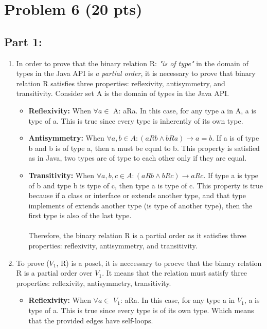 \clearpage
\newpage

\section{Problem 6 (20 pts)}

\subsection{Part 1:}
\begin{enumerate}
    \item In order to prove that the binary relation R: \textit{"is of type"} in the domain of types in the Java API is \textit{a partial order}, it is necessary to prove that binary relation R satisfies three properties: reflexivity, antisymmetry, and transitivity. Consider set A is the domain of types in the Java API.
    \begin{itemize}
        \item \textbf{Reflexivity: } When $\forall a \in$ A: aRa. In this case, for any type a in A, a is type of a. This is true since every type is inherently of its own type.
        \item \textbf{Antisymmetry: } When $\forall a, b \in A: (aRb \wedge bRa) \rightarrow a = b$. If a is of type b and b is of type a, then a must be equal to b. This property is satisfied as in Java, two types are of type to each other only if they are equal. 
        \item \textbf{Transitivity: } When $\forall a, b, c \in A: (aRb \wedge bRc) \rightarrow aRc$. If type a is type of b and type b is type of c, then type a is type of c. This property is true because if a class or interface or extends another type, and that type implements of extends another type (is type of another type), then the first type is also of the last type. \\ \\
        Therefore, the binary relation R is a partial order as it satisfies three properties: reflexivity, antisymmetry, and transitivity. 
    \end{itemize}
    \item To prove ($V_{1}$, R) is a poset, it is neccessary to procve that the binary relation R is a partial order over $V_{1}$. It means that the relation must satisfy three properties: reflexivity, antisymmetry, transitivity. 
    \begin{itemize}
        \item \textbf{Reflexivity: } When $\forall a \in$ $V_{1}$: aRa. In this case, for any type a in $V_{1}$, a is type of a. This is true since every type is of its own type. Which means that the provided edges have self-loops.

\end{itemize}
\end{enumerate}

